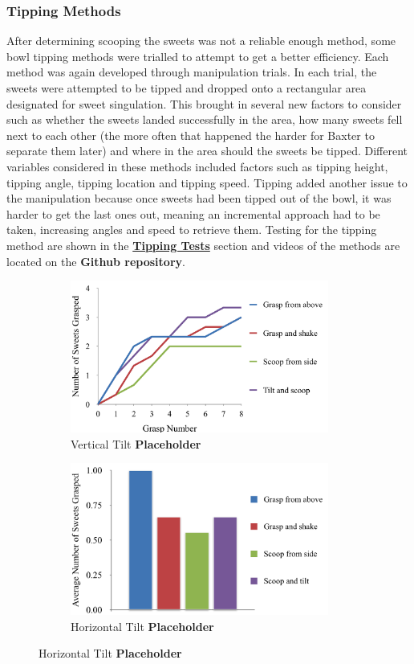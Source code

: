 \subsubsection{Tipping Methods}
After determining scooping the sweets was not a reliable enough method, some bowl tipping methods were trialled to attempt to get a better efficiency. Each method was again developed through manipulation trials. In each trial, the sweets were attempted to be tipped and dropped onto a rectangular area designated for sweet singulation. This brought in several new factors to consider such as whether the sweets landed successfully in the area, how many sweets fell next to each other (the more often that happened the harder for Baxter to separate them later) and where in the area should the sweets be tipped.
\newline\newline
Different variables considered in these methods included factors such as tipping height, tipping angle, tipping location and tipping speed. Tipping added another issue to the manipulation because once sweets had been tipped out of the bowl, it was harder to get the last ones out, meaning an incremental approach had to be taken, increasing angles and speed to retrieve them. Testing for the tipping method are shown in the \hyperref[sssec:TippingTest]{\textbf{Tipping Tests}} section and videos of the methods are located on the \textbf{Github repository}.
\begin{figure}[ht!]
    \captionsetup[subfigure]{justification=centering}
    \begin{subfigure}[H]{0.475\textwidth}   
        \centering 
        \caption{Vertical Tilt \textbf{Placeholder}}
        \label{fig:TimeGrasp}
        \includegraphics[width=\textwidth, height=5cm]{graspovertime.png}
    \end{subfigure}
    \begin{subfigure}[H]{0.475\textwidth}   
        \centering 
        \caption{Horizontal Tilt \textbf{Placeholder}}
        \label{fig:AverageGrasp}
        \includegraphics[width=\textwidth, height=5cm]{averagegrasp.png}
    \end{subfigure}
\end{figure}
